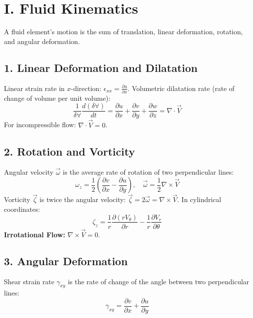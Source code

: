\documentclass[9pt, a4paper, twocolumn]{article}
\begin{document}
\section{I. Fluid Kinematics}
A fluid element's motion is the sum of translation, linear deformation, rotation, and angular deformation.

\subsection{1. Linear Deformation and Dilatation}
Linear strain rate in $x$-direction: $\epsilon_{xx} = \frac{\partial u}{\partial x}$.
Volumetric dilatation rate (rate of change of volume per unit volume):
\begin{equation*}
    \frac{1}{\delta \forall} \frac{d(\delta \forall)}{dt} = \frac{\partial u}{\partial x} + \frac{\partial v}{\partial y} + \frac{\partial w}{\partial z} = \nabla \cdot \vec{V}
\end{equation*}
For incompressible flow: $\nabla \cdot \vec{V} = 0$.

\subsection{2. Rotation and Vorticity}
Angular velocity $\vec{\omega}$ is the average rate of rotation of two perpendicular lines:
\begin{equation*}
    \omega_z = \frac{1}{2} \left( \frac{\partial v}{\partial x} - \frac{\partial u}{\partial y} \right), \quad \vec{\omega} = \frac{1}{2} \nabla \times \vec{V}
\end{equation*}
Vorticity $\vec{\zeta}$ is twice the angular velocity: $\vec{\zeta} = 2\vec{\omega} = \nabla \times \vec{V}$.
In cylindrical coordinates:
\begin{equation*}
    \zeta_z = \frac{1}{r} \frac{\partial (r V_\theta)}{\partial r} - \frac{1}{r} \frac{\partial V_r}{\partial \theta}
\end{equation*}
\textbf{Irrotational Flow:} $\nabla \times \vec{V} = 0$.

\subsection{3. Angular Deformation}
Shear strain rate $\gamma_{xy}$ is the rate of change of the angle between two perpendicular lines:
\begin{equation*}
    \gamma_{xy} = \frac{\partial v}{\partial x} + \frac{\partial u}{\partial y}
\end{equation*}
\end{document}
